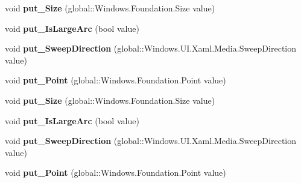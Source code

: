 \begin{DoxyCompactItemize}
void {\bfseries put\+\_\+\+Size} (global\+::\+Windows.\+Foundation.\+Size value)
\item 
\mbox{\label{interface_windows_1_1_u_i_1_1_xaml_1_1_media_1_1_i_arc_segment_ae090da4e0e10d6c6fba41eb81f4e56f4}} 
void {\bfseries put\+\_\+\+Is\+Large\+Arc} (bool value)
\item 
\mbox{\label{interface_windows_1_1_u_i_1_1_xaml_1_1_media_1_1_i_arc_segment_aa5c0f05483cfe843d18d35db2877ad20}} 
void {\bfseries put\+\_\+\+Sweep\+Direction} (global\+::\+Windows.\+U\+I.\+Xaml.\+Media.\+Sweep\+Direction value)
\item 
\mbox{\label{interface_windows_1_1_u_i_1_1_xaml_1_1_media_1_1_i_arc_segment_aa012b7d8361f03f19e160daaac966cb2}} 
void {\bfseries put\+\_\+\+Point} (global\+::\+Windows.\+Foundation.\+Point value)
\item 
\mbox{\label{interface_windows_1_1_u_i_1_1_xaml_1_1_media_1_1_i_arc_segment_a38665026a67cd69927958162dd6dc109}} 
void {\bfseries put\+\_\+\+Size} (global\+::\+Windows.\+Foundation.\+Size value)
\item 
\mbox{\label{interface_windows_1_1_u_i_1_1_xaml_1_1_media_1_1_i_arc_segment_ae090da4e0e10d6c6fba41eb81f4e56f4}} 
void {\bfseries put\+\_\+\+Is\+Large\+Arc} (bool value)
\item 
\mbox{\label{interface_windows_1_1_u_i_1_1_xaml_1_1_media_1_1_i_arc_segment_aa5c0f05483cfe843d18d35db2877ad20}} 
void {\bfseries put\+\_\+\+Sweep\+Direction} (global\+::\+Windows.\+U\+I.\+Xaml.\+Media.\+Sweep\+Direction value)
\item 
\mbox{\label{interface_windows_1_1_u_i_1_1_xaml_1_1_media_1_1_i_arc_segment_aa012b7d8361f03f19e160daaac966cb2}} 
void {\bfseries put\+\_\+\+Point} (global\+::\+Windows.\+Foundation.\+Point value)
\item 

\end{DoxyCompactItemize}
